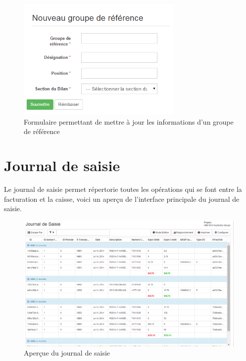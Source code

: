 \documentclass[12pt,a4paper]{report}
\begin{document}
\begin{figure}[h]
\begin{center}
\includegraphics[width=8cm]{pic/EdtRefGroup.png}
\end{center}
\caption{Formulaire permettant de mettre à jour les informations d'un groupe de référence}
\label{Formulaire permettant de mettre à jour les informations d'un groupe de référence}
\end{figure} 


\newpage
\section{Journal de saisie}
Le journal de saisie  permet répertorie toutes les opérations qui se font entre la facturation et la caisse, voici un aperçu de l'interface principale du journal de saisie.

\begin{figure}[h]
\begin{center}
\includegraphics[width=14cm]{pic/JournalSaisie.png}
\end{center}
\caption{Aperçue du journal de saisie}
\label{Aperçue du journal de saisie}
\end{figure}
\end{document}
